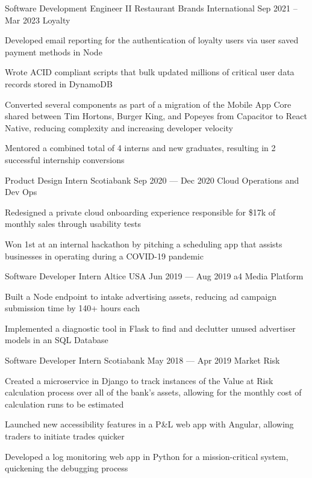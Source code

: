 \begin{cventries}
  \cventry
      {Software Development Engineer II}
      {Restaurant Brands International}
      {}
      {Sep 2021 -- Mar 2023}
      {Loyalty}
      {
        \begin{cvitems}
          \item {Developed email reporting for the authentication of loyalty users via user saved payment methods in Node}
          \item {Wrote ACID compliant scripts that bulk updated millions of critical user data records stored in DynamoDB}
          \item {Converted several components as part of a migration of the Mobile App Core shared between Tim Hortons, Burger King, and Popeyes from Capacitor to React Native, reducing complexity and increasing developer velocity}
          \item {Mentored a combined total of 4 interns and new graduates, resulting in 2 successful internship conversions}
        \end{cvitems}
      }
  \cventry
    {Product Design Intern}
    {Scotiabank}
    {}
    {Sep 2020 --- Dec 2020}
    {Cloud Operations and Dev Ops}
    {
      \begin{cvitems}
        \item {Redesigned a private cloud onboarding experience responsible for \$17k of monthly sales through usability tests}
        \item {Won 1st at an internal hackathon by pitching a scheduling app that assists businesses in operating during a COVID-19 pandemic}
      \end{cvitems}
    }

  \cventry
    {Software Developer Intern}
    {Altice USA}
    {}
    {Jun 2019 --- Aug 2019}
    {a4 Media Platform}
    {
    \begin{cvitems}
      \item {Built a Node endpoint to intake advertising assets, reducing ad campaign submission time by 140+ hours each}
      \item {Implemented a diagnostic tool in Flask to find and declutter unused advertiser models in an SQL Database}
    \end{cvitems}
    }

  \cventry
    {Software Developer Intern}
    {Scotiabank}
    {}
    {May 2018 --- Apr 2019}
    {Market Risk}
    {
      \begin{cvitems}
        \item {Created a microservice in Django to track instances of the Value at Risk calculation process over all of the bank's assets, allowing for the monthly cost of calculation runs to be estimated}
        \item {Launched new accessibility features in a P\&L web app with Angular, allowing traders to initiate trades quicker}
        \item {Developed a log monitoring web app in Python for a mission-critical system, quickening the debugging process}
      \end{cvitems}
    }
\end{cventries}
